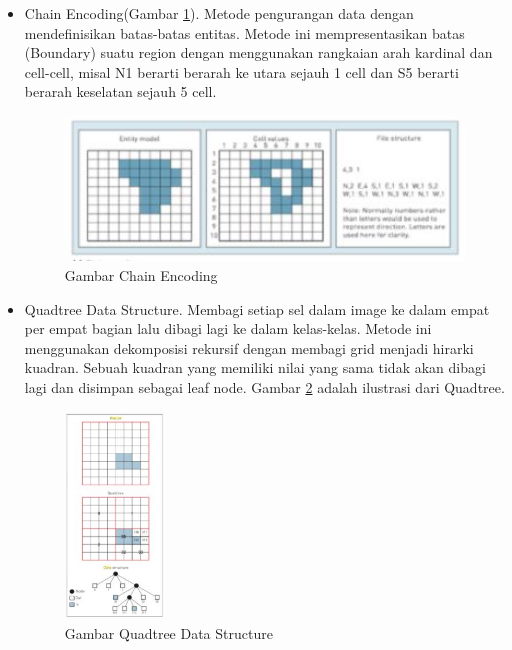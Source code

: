 \begin{itemize}
\begin{figure} [ht]
				\end{figure}

		\item  Chain Encoding(Gambar \ref{chainencoding}). Metode pengurangan data dengan mendefinisikan batas-batas entitas. Metode ini mempresentasikan batas (Boundary) suatu region dengan menggunakan rangkaian arah kardinal dan cell-cell, misal N1 berarti berarah ke utara sejauh 1 cell dan S5 berarti berarah keselatan sejauh 5 cell.
				\begin{figure} [ht]
					\centerline{\includegraphics[width=1\textwidth]{figures/chainencoding.JPG}}
					\caption{Gambar Chain Encoding}
					\label{chainencoding}
				\end{figure}

		\item  Quadtree Data Structure. Membagi setiap sel dalam image ke dalam empat per empat bagian lalu dibagi lagi ke dalam kelas-kelas. Metode ini menggunakan dekomposisi rekursif dengan membagi grid menjadi hirarki kuadran. Sebuah kuadran yang memiliki nilai yang sama tidak akan dibagi lagi dan disimpan sebagai leaf node. Gambar \ref{quadtreedatastructure} adalah ilustrasi dari Quadtree.
				\begin{figure} [ht]
					\centerline{\includegraphics[width=0.25\textwidth]{figures/quadtreedatastructure.JPG}}
					\caption{Gambar Quadtree Data Structure}
					\label{quadtreedatastructure}
				\end{figure}
	\end{itemize}

